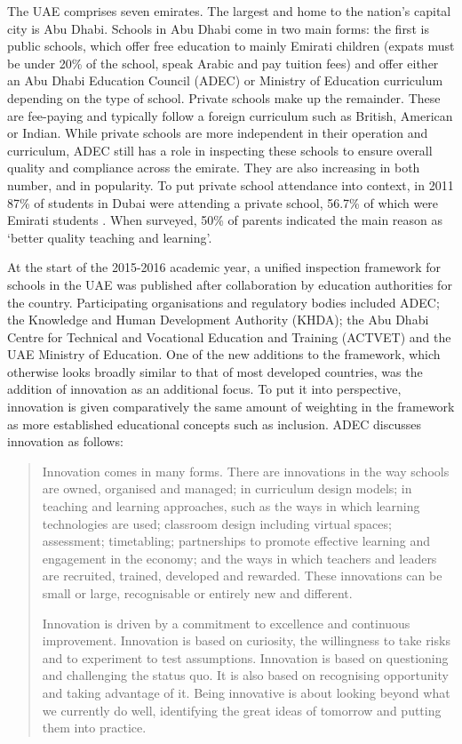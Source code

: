 \documentclass[11pt]{article}
\begin{document}
The UAE comprises seven emirates. The largest and home to the nation's capital city is Abu Dhabi. Schools in Abu Dhabi come in two main forms: the first is public schools, which offer free education to mainly Emirati children (expats must be under 20\% of the school, speak Arabic and pay tuition fees) and offer either an Abu Dhabi Education Council (ADEC) or Ministry of Education curriculum depending on the type of school. Private schools make up the remainder. These are fee-paying and typically follow a foreign curriculum such as British, American or Indian. While private schools are more independent in their operation and curriculum, ADEC still has a role in inspecting these schools to ensure overall quality and compliance across the emirate. They are also increasing in both number, and in popularity. To put private school attendance into context, in 2011 87\% of students in Dubai were attending a private school, 56.7\% of which were Emirati students \cite[p.16]{Kenaid2011}. When surveyed, 50\% of parents indicated the main reason as `better quality teaching and learning'.

At the start of the 2015-2016 academic year, a unified inspection framework for schools in the UAE was published after collaboration by education authorities for the country. Participating organisations and regulatory bodies included ADEC; the Knowledge and Human Development Authority (KHDA); the Abu Dhabi Centre for Technical and Vocational Education and Training (ACTVET) and the UAE Ministry of Education. One of the new additions to the framework, which otherwise looks broadly similar to that of most developed countries, was the addition of innovation as an additional focus. To put it into perspective, innovation is given comparatively the same amount of weighting in the framework as more established educational concepts such as inclusion. ADEC discusses innovation as follows:

\begin{quote}
	Innovation comes in many forms. There are innovations in the way schools are owned, organised and managed; in curriculum design models; in teaching and learning approaches, such as the ways in which learning technologies are used; classroom design including virtual spaces; assessment; timetabling; partnerships to promote effective learning and engagement in the economy; and the ways in which teachers and leaders are recruited, trained, developed and rewarded. These innovations can be small or large, recognisable or entirely new and different.
	
	Innovation is driven by a commitment to excellence and continuous improvement. Innovation is based on curiosity, the willingness to take risks and to experiment to test assumptions. Innovation is based on questioning and challenging the status quo. It is also based on recognising opportunity and taking advantage of it. Being innovative is about looking beyond what we currently do well, identifying the great ideas of tomorrow and putting them into practice.
\end{quote} \cite[p.12]{ADEC2015}
\end{document}
